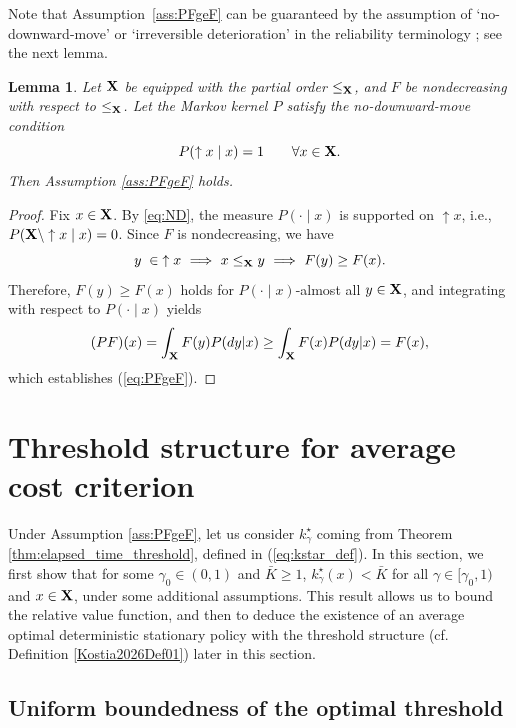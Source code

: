 \documentclass[letterpaper,10pt,conference]{ieeeconf}  %
\newtheorem{lemma}{Lemma}
\begin{document}
\smallskip

Note that Assumption~\ref{ass:PFgeF} can be guaranteed by the assumption of `no-downward-move' or
`irreversible deterioration' in the reliability terminology \cite{BP96}; see the next lemma.

\medskip
\begin{lemma}
\label{lem:ND_implies_PF_ge_F}
Let {${\bf X}$} be equipped with the partial order $\le_{\bf X}$, and $F$ be nondecreasing with respect to $\le_{{\bf X}}$.
Let the Markov kernel $P$ satisfy the \emph{no-downward-move}
condition
\begin{equation}
\label{eq:ND}
P(\uparrow x\mid x)=1 \qquad \forall x\in {\bf X}.
\end{equation}
Then  Assumption \ref{ass:PFgeF} holds.
\end{lemma}
\medskip
\begin{proof}
Fix $x\in {\bf X}$. By \eqref{eq:ND}, the measure $P(\cdot\mid x)$ is supported on $\uparrow x$, i.e.,
$P({\bf X}\setminus \uparrow x \mid x)=0$. Since $F$ is nondecreasing, we have
\[
y\; \in \; \uparrow x \ \Longrightarrow\ {x\le_{\bf X}y} \ \Longrightarrow\ F(y)\ge F(x).
\]
Therefore, $F(y)\ge F(x)$ holds for $P(\cdot\mid x)$-almost {all $y\in{\bf X}$}, and integrating {with respect to $P(\cdot\mid x)$} yields
\[
(PF)(x)=\int_{\bf X} F(y)P(dy| x)\ge\int_{\bf X} F(x)P(dy| x)=F(x),
\]
which establishes (\ref{eq:PFgeF}).
\end{proof}
\medskip

\section{Threshold structure for average cost criterion}

Under Assumption  \ref{ass:PFgeF}, let us consider $k_\gamma^\star$ coming from Theorem \ref{thm:elapsed_time_threshold}, defined in (\ref{eq:kstar_def}). In this section, we first show that for some $\gamma_0\in(0,1)$ and $\bar{K}\ge 1$, $k_\gamma^\star(x)<\bar{K}$ for all $\gamma\in [\gamma_0,1)$ and $x\in {\bf X}$, under some additional assumptions. This result allows us to bound the relative value function, and then to deduce the existence of an average optimal deterministic stationary policy with the threshold structure (cf. Definition \ref{Kostia2026Def01}) later in this section.   

\subsection{Uniform {boundedness} of the optimal threshold}  
\end{document}
